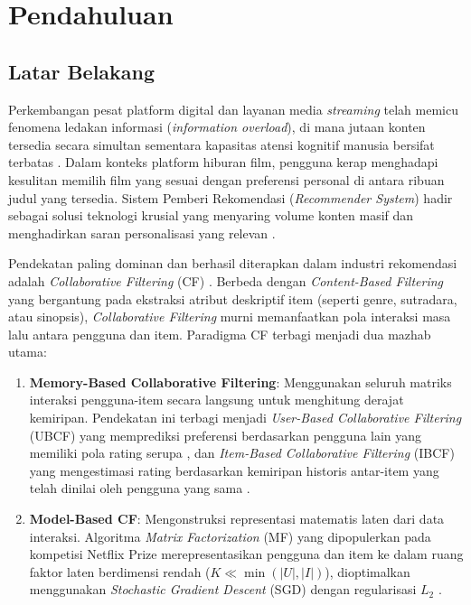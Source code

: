 \chapter{Pendahuluan}

\section{Latar Belakang}
Perkembangan pesat platform digital dan layanan media \textit{streaming} telah memicu fenomena ledakan informasi (\textit{information overload}), di mana jutaan konten tersedia secara simultan sementara kapasitas atensi kognitif manusia bersifat terbatas \citep{ricci2015recommender}. Dalam konteks platform hiburan film, pengguna kerap menghadapi kesulitan memilih film yang sesuai dengan preferensi personal di antara ribuan judul yang tersedia. Sistem Pemberi Rekomendasi (\textit{Recommender System}) hadir sebagai solusi teknologi krusial yang menyaring volume konten masif dan menghadirkan saran personalisasi yang relevan \citep{jannach2010recommender}.

Pendekatan paling dominan dan berhasil diterapkan dalam industri rekomendasi adalah \textit{Collaborative Filtering} (CF) \citep{su2009survey}. Berbeda dengan \textit{Content-Based Filtering} yang bergantung pada ekstraksi atribut deskriptif item (seperti genre, sutradara, atau sinopsis), \textit{Collaborative Filtering} murni memanfaatkan pola interaksi masa lalu antara pengguna dan item. Paradigma CF terbagi menjadi dua mazhab utama:
\begin{enumerate}
    \item \textbf{Memory-Based Collaborative Filtering}: Menggunakan seluruh matriks interaksi pengguna-item secara langsung untuk menghitung derajat kemiripan. Pendekatan ini terbagi menjadi \textit{User-Based Collaborative Filtering} (UBCF) yang memprediksi preferensi berdasarkan pengguna lain yang memiliki pola rating serupa \citep{resnick1994grouplens}, dan \textit{Item-Based Collaborative Filtering} (IBCF) yang mengestimasi rating berdasarkan kemiripan historis antar-item yang telah dinilai oleh pengguna yang sama \citep{sarwar2001item}.
    \item \textbf{Model-Based CF}: Mengonstruksi representasi matematis laten dari data interaksi. Algoritma \textit{Matrix Factorization} (MF) yang dipopulerkan pada kompetisi Netflix Prize merepresentasikan pengguna dan item ke dalam ruang faktor laten berdimensi rendah ($K \ll \min(|U|, |I|)$), dioptimalkan menggunakan \textit{Stochastic Gradient Descent} (SGD) dengan regularisasi $L_2$ \citep{koren2009matrix}.
\end{enumerate}

